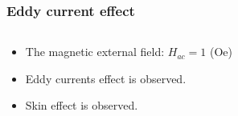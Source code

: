 \documentclass[compress]{beamer}
\begin{document}
\begin{frame}\frametitle{Eddy current effect}
\begin{columns}[totalwidth=\textwidth]
 \begin{column}{.39\textwidth}
\begin{itemize}[label=$\bullet$, font=\small, leftmargin=*]
\item The magnetic external field: $H_{ac}=1$ (Oe)
\item Eddy currents effect is observed. 
\item Skin effect is observed.
\end{itemize}

\end{column}
\end{columns}
\end{frame}
\end{document}
